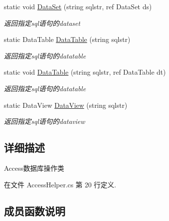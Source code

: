 \begin{DoxyCompactItemize}
static void \hyperlink{class_x_c_l_net_tools_1_1_data_base_1_1_access_1_1_access_helper_aa66ad22b5bfc24c630e34a62a085995f}{Data\+Set} (string sqlstr, ref Data\+Set ds)
\begin{DoxyCompactList}\small\item\em 返回指定sql语句的dataset \end{DoxyCompactList}\item 
static Data\+Table \hyperlink{class_x_c_l_net_tools_1_1_data_base_1_1_access_1_1_access_helper_aec0d16c3a29668e1298500b0f87d0f6e}{Data\+Table} (string sqlstr)
\begin{DoxyCompactList}\small\item\em 返回指定sql语句的datatable \end{DoxyCompactList}\item 
static void \hyperlink{class_x_c_l_net_tools_1_1_data_base_1_1_access_1_1_access_helper_a4ee3cbd4a9212d6df954c2228c2ff2f4}{Data\+Table} (string sqlstr, ref Data\+Table dt)
\begin{DoxyCompactList}\small\item\em 返回指定sql语句的datatable \end{DoxyCompactList}\item 
static Data\+View \hyperlink{class_x_c_l_net_tools_1_1_data_base_1_1_access_1_1_access_helper_a3979a6d17790d9ecc1cc9c4bcf56de84}{Data\+View} (string sqlstr)
\begin{DoxyCompactList}\small\item\em 返回指定sql语句的dataview \end{DoxyCompactList}\end{DoxyCompactItemize}


\subsection{详细描述}
Access数据库操作类 



在文件 Access\+Helper.\+cs 第 20 行定义.



\subsection{成员函数说明}
